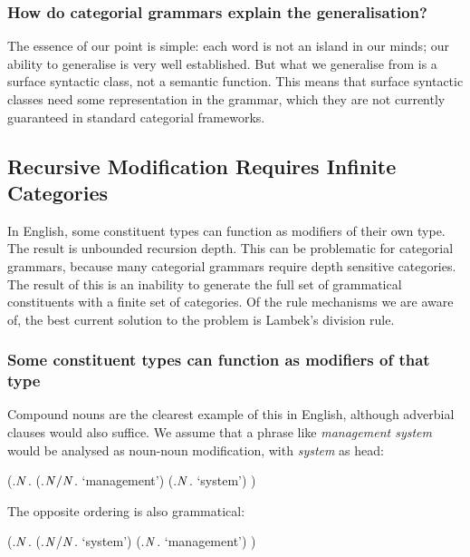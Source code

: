 \documentclass[11pt,twoside,final]{ahudson-harvard}
\newcommand{\cf}[1]{\mbox{$\it{#1}$}}   %
\begin{document}
\subsubsection{How do categorial grammars explain the generalisation?}

The essence of our point is simple: each word is not an island in our minds; our ability to generalise is very well established. But what we generalise from is a surface syntactic class, not a semantic function. This means that surface syntactic classes need some representation in the grammar, which they are not currently guaranteed in standard categorial frameworks.


\subsection{Recursive Modification Requires Infinite Categories}

In English, some constituent types can function as modifiers of their own type. The result is unbounded recursion depth. This can be problematic for categorial grammars, because many categorial grammars require depth sensitive categories. The result of this is an inability to generate the full set of grammatical constituents with a finite set of categories. Of the rule mechanisms we are aware of, the best current solution to the problem is Lambek's division rule.

\subsubsection{Some constituent types can function as modifiers of that type}

Compound nouns are the clearest example of this in English, although adverbial clauses would also suffice. We assume that a phrase like \emph{management system} would be analysed as noun-noun modification, with \emph{system} as head:

\begin{center}
\begin{parsetree}
(.\cf{N}.
  (.\cf{N/N}. `management')
  (.\cf{N}.   `system')
)
\end{parsetree}
\end{center}

The opposite ordering is also grammatical:

\begin{center}
\begin{parsetree}
(.\cf{N}.
  (.\cf{N/N}. `system')
  (.\cf{N}.   `management')
)
\end{parsetree}
\end{center}
\end{document}
